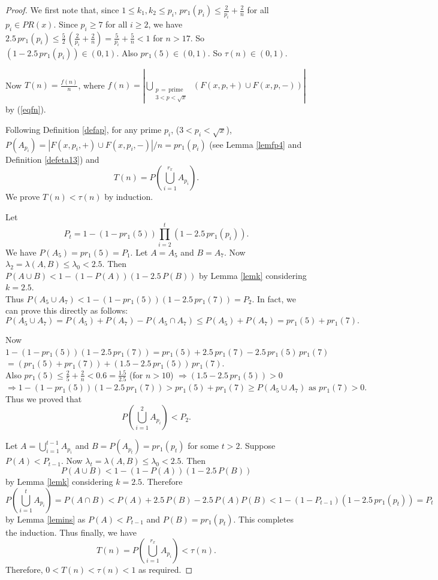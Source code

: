 \documentclass[11pt]{article}
\theoremstyle{definition}
\theoremstyle{remark}
\numberwithin{equation}{section}
\begin{document}
\begin{proof}
We first note that, since $1\leq k_1,k_2\leq p_i$, $pr_1(p_i)\leq \frac{2}{p_i}+\frac{2}{n}$ for all $p_i\in PR(x)$. Since $p_i\geq 7$ for all $i\geq 2$, we have $2.5\, pr_1(p_i)\leq \frac{5}{2}\, (\frac{2}{p_i}+\frac{2}{n})=\frac{5}{p_i}+\frac{5}{n}<1$ for $n>17$. So $(1-2.5\, pr_1(p_i))\in (0,1)$. Also $pr_1(5)\in (0,1)$. So $\tau(n)\in (0,1)$. 

\vspace{1em}
\noindent
Now $T(n)=\frac{f(n)}{n}$, where $f(n)=|\bigcup\limits_{\substack{p\, =\, \text{prime}\\ 3<p<\sqrt{x}}} \ \left(F(x,p,+)\cup F(x,p,-)\right)|$ by (\ref{eqfn}).

\vspace{1em}
\noindent
 Following Definition \ref{defap}, for any prime $p_i$, ($3<p_i<\sqrt{x}$),\\
 $P(A_{p_i})=|F(x,p_i,+)\cup F(x,p_i,-)|/n=pr_1(p_i)$ (see Lemma \ref{lemfp4} and Definition \ref{defeta13}) and 
$$T(n)=P(\bigcup\limits_{i=1}^{r_x} A_{p_i}).$$
We prove $T(n)<\tau(n)$ by induction. 

\vspace{1em}
\noindent
Let
$$P_{t}=1-(1-pr_1(5))\prod\limits_{i=2}^{t} (1-2.5\, pr_1(p_i)).$$
We have $P(A_5)=pr_1(5)=P_1$. Let $A=A_5$ and $B=A_7$. Now $\lambda_2=\lambda(A,B)\leq \lambda_0<2.5$. Then $P(A\cup B)<1-(1-P(A))(1-2.5\, P(B))$ by Lemma \ref{lemk} considering $k=2.5$.\\
 Thus $P(A_5\cup A_7)<1-(1-pr_1(5))(1-2.5\, pr_1(7))=P_2$. In fact, we can prove this directly as follows:
$$P(A_5\cup A_7)=P(A_5)+P(A_7)-P(A_5\cap A_7)\leq P(A_5)+P(A_7)=pr_1(5)+pr_1(7).$$

\noindent
Now $1-(1-pr_1(5))(1-2.5\, pr_1(7))=pr_1(5)+2.5\, pr_1(7)-2.5\, pr_1(5)\, pr_1(7)$\\[0.5em]
\null\hspace{2.3in} $= \left(pr_1(5)+pr_1(7)\right)+\left(1.5-2.5\, pr_1(5)\right)\, pr_1(7)$.\\[0.5em]
Also $pr_1(5)\leq \frac{2}{5}+\frac{2}{n}<0.6=\frac{1.5}{2.5}$ (for $n> 10$) $\Longrightarrow \left(1.5-2.5\, pr_1(5)\right)>0$\\[0.5em]
$\Longrightarrow 1-(1-pr_1(5))(1-2.5\, pr_1(7))>pr_1(5)+pr_1(7)\geq P(A_5\cup A_7) \text{ as }pr_1(7)>0.$
Thus we proved that 
$$P(\bigcup\limits_{i=1}^{2} A_{p_i}) <P_2.$$

\vspace{1em}
\noindent
Let $A=\bigcup\limits_{i=1}^{t-1} A_{p_i}$ and $B=P(A_{p_t})=pr_1(p_t)$ for some $t>2$. Suppose $P(A)<P_{t-1}$. Now $\lambda_t=\lambda(A,B)\leq \lambda_0<2.5$. Then 
$$P(A\cup B)<1-(1-P(A))(1-2.5\, P(B))$$
by Lemma \ref{lemk} considering $k=2.5$. Therefore 
$$P(\bigcup\limits_{i=1}^{t} A_{p_i})=P(A\cap B)<P(A)+2.5\, P(B)-2.5\, P(A)P(B)<1-(1-P_{t-1})(1-2.5\, pr_1(p_t))=P_t$$
by Lemma \ref{lemins} as $P(A)<P_{t-1}$ and $P(B)=pr_1(p_t)$. This completes the induction. Thus finally, we have 
$$T(n)=P(\bigcup\limits_{i=1}^{r_x} A_{p_i})<\tau(n).$$
Therefore, $0<T(n)<\tau(n)<1$ as required.
\end{proof}
\end{document}
